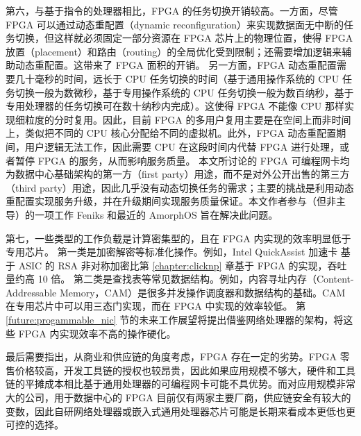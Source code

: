 第六，与基于指令的处理器相比，FPGA 的任务切换开销较高。一方面，尽管 FPGA 可以通过动态重配置（dynamic reconfiguration）来实现数据面无中断的任务切换，但这样就必须固定一部分资源在 FPGA 芯片上的物理位置，使得 FPGA 放置（placement）和路由（routing）的全局优化受到限制；还需要增加逻辑来辅助动态重配置。这带来了 FPGA 面积的开销。
另一方面，FPGA 动态重配置需要几十毫秒的时间，远长于 CPU 任务切换的时间（基于通用操作系统的 CPU 任务切换一般为数微秒，基于专用操作系统的 CPU 任务切换一般为数百纳秒，基于专用处理器的任务切换可在数十纳秒内完成）。这使得 FPGA 不能像 CPU 那样实现细粒度的分时复用。因此，目前 FPGA 的多用户复用主要是在空间上而非时间上，类似把不同的 CPU 核心分配给不同的虚拟机。此外，FPGA 动态重配置期间，用户逻辑无法工作，因此需要 CPU 在这段时间内代替 FPGA 进行处理，或者暂停 FPGA 的服务，从而影响服务质量。
本文所讨论的 FPGA 可编程网卡均为数据中心基础架构的第一方（first party）用途，而不是对外公开出售的第三方（third party）用途，因此几乎没有动态切换任务的需求；主要的挑战是利用动态重配置实现服务升级，并在升级期间实现服务质量保证。本文作者参与（但非主导）的一项工作 Feniks \cite{zhang2017feniks} 和最近的 AmorphOS \cite{khawaja2018sharing} 旨在解决此问题。

第七，一些类型的工作负载是计算密集型的，且在 FPGA 内实现的效率明显低于专用芯片。
第一类是加密解密等标准化操作。例如，Intel QuickAssist 加速卡 \cite{intel-qat} 基于 ASIC 的 RSA 非对称加密比第 \ref{chapter:clicknp} 章基于 FPGA 的实现，吞吐量约高 10 倍。
第二类是查找表等常见数据结构。例如，内容寻址内存（Content-Addressable Memory，CAM）是很多并发操作调度器和数据结构的基础。CAM 在专用芯片中可以用三态门实现，而在 FPGA 中实现的效率较低。
第 \ref{future:progammable_nic} 节的未来工作展望将提出借鉴网络处理器的架构，将这些 FPGA 内实现效率不高的操作硬化。

最后需要指出，从商业和供应链的角度考虑，FPGA 存在一定的劣势。FPGA 零售价格较高，开发工具链的授权也较昂贵，因此如果应用规模不够大，硬件和工具链的平摊成本相比基于通用处理器的可编程网卡可能不具优势。而对应用规模非常大的公司，用于数据中心的 FPGA 目前仅有两家主要厂商，供应链安全有较大的变数，因此自研网络处理器或嵌入式通用处理器芯片可能是长期来看成本更低也更可控的选择。

